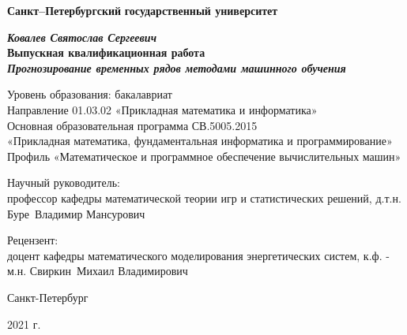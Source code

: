 
\begin{titlepage}
\begin{center}
\textbf{Санкт--Петербургский}
\textbf{государственный университет}

\vspace{35mm}

\textbf{\textit{\large Ковалев Святослав Сергеевич}} \\[8mm]
\textbf{\large Выпускная квалификационная работа}\\[3mm]
\textbf{\textit{\large Прогнозирование временных рядов методами машинного обучения}}

\vspace{20mm}
Уровень образования: бакалавриат\\
Направление 01.03.02 «Прикладная математика и информатика»\\
Основная образовательная программа СВ.5005.2015 \\
«Прикладная математика, фундаментальная информатика и программирование»\\
Профиль «Математическое и программное обеспечение вычислительных машин»\\[30mm]


\begin{flushright}
{Научный руководитель:} \\
профессор кафедры математической теории игр и статистических решений, д.т.н.  Буре~Владимир Мансурович
\end{flushright}
\begin{flushright}
{Рецензент:} \\
доцент кафедры математического моделирования энергетических систем, к.ф. - м.н.  Свиркин~Михаил Владимирович
\end{flushright}

\vfill 

{Санкт-Петербург}
\par{2021 г.}
\end{center}
\end{titlepage}
\restoregeometry
\addtocounter{page}{1}